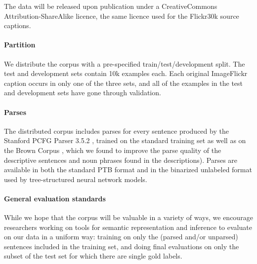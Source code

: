 The data will be released upon publication under a CreativeCommons
Attribution-ShareAlike licence, the same licence used for the Flickr30k source captions.


\paragraph{Partition} We distribute the corpus with a pre-specified train/test/development split. The test and development sets contain 10k examples each. Each original ImageFlickr caption occurs in only one of the three sets, and all of the examples in the test and development sets have gone through validation.


\paragraph{Parses}

The distributed corpus includes parses for every sentence produced by the Stanford PCFG Parser 3.5.2 \cite{klein2003accurate}, trained on the standard training set as well as on the Brown Corpus \cite{francis1979brown}, which we found to improve the parse quality of the descriptive sentences and noun phrases found in the descriptions). Parses are available in both the standard PTB format and in the binarized unlabeled format used by tree-structured neural network models.

\paragraph{General evaluation standards}
While we hope that the corpus will be valuable in a variety of ways, we encourage researchers working on tools for semantic representation and inference to evaluate on our data in a uniform way: training on only the (parsed and/or unparsed) sentences included in the training set, and doing final evaluations on only the subset of the test set for which there are single gold labels.
